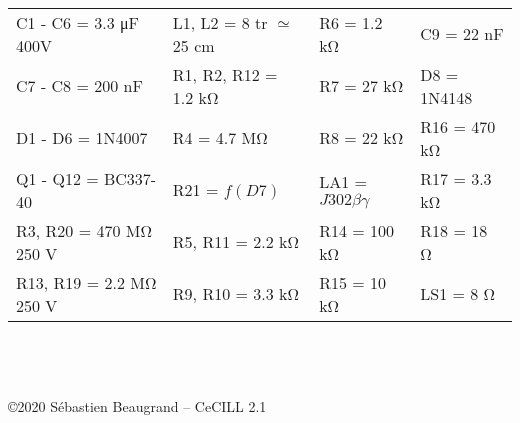 \documentclass{kicad}
\begin{document}
\begin{center}
~\\
~\\
\hspace*{-4mm}\\
~\\
~\\
\begin{tabular}{llll}
C1 - C6  = 3.3 \si{\micro\farad} 400\si{\volt}&
L1, L2 = 8 tr $\simeq$ 25 \si{\centi\meter}&
R6 = 1.2 \si{\kilo\ohm}&
C9 = 22 \si{\nano\farad}\\
C7 - C8  = 200 \si{\nano\farad}&
R1, R2, R12 = 1.2 \si{\kilo\ohm}&
R7 = 27 \si{\kilo\ohm}&
D8 = 1N4148\\
D1 - D6  = 1N4007&
R4 = 4.7 \si{\mega\ohm}&
R8 = 22 \si{\kilo\ohm}&
R16 = 470 \si{\kilo\ohm}\\
Q1 - Q12 = BC337-40&
R21 = $f(D7)$&
LA1 = $J302\beta\gamma$&
R17 = 3.3 \si{\kilo\ohm}\\
R3, R20 = 470 \si{\mega\ohm} 250 \si{\volt}&
R5, R11 = 2.2 \si{\kilo\ohm}&
R14 = 100 \si{\kilo\ohm}&
R18 = 18 \si{\ohm}\\
R13, R19 = 2.2 \si{\mega\ohm} 250 \si{\volt}&
R9, R10 = 3.3 \si{\kilo\ohm}&
R15 = 10 \si{\kilo\ohm}&
LS1 = 8 \si{\ohm}
\end{tabular}
\\
~\\
\\
\vfill
\scriptsize
\copyright 2020 Sébastien Beaugrand -- CeCILL 2.1
\end{center}
\end{document}
